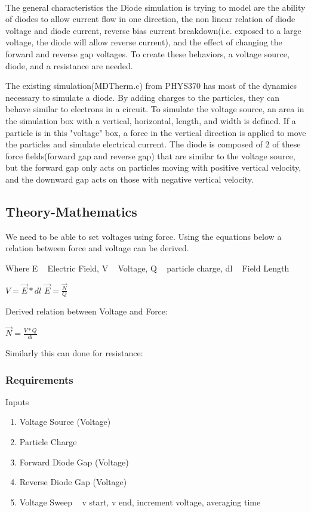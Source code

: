 \documentclass[a4paper]{article}
\begin{document}
\paragraph{}

The general characteristics the Diode simulation is trying to model are the ability of diodes to allow current flow in one direction, the non linear relation of diode voltage and diode current, reverse bias current breakdown(i.e. exposed to a large voltage, the diode will allow reverse current), and the effect of changing the forward and reverse gap voltages. To create these behaviors, a voltage source, diode, and a resistance are needed. 

The existing simulation(MDTherm.c) from PHYS370 has most of the dynamics necessary to simulate a diode. By adding charges to the particles, they can behave similar to electrons in a circuit. To simulate the voltage source, an area in the simulation box with a vertical, horizontal, length, and width is defined. If a particle is in this "voltage" box, a force in the vertical direction is applied to move the particles and simulate electrical current. The diode is composed of 2 of these force fields(forward gap and reverse gap) that are similar to the voltage source, but the forward gap only acts on particles moving with positive vertical velocity, and the downward gap acts on those with negative vertical velocity.

\subsection{Theory-Mathematics}

We need to be able to set voltages using force. Using the equations below a relation between force and voltage can be derived.

Where E ~ Electric Field, V ~ Voltage, Q ~ particle charge, dl ~ Field Length

$ V = \vec{E}*dl $ 
$ \vec{E} = \frac{\vec{N}}{Q} $

Derived relation between Voltage and Force:

$ \vec{N} = \frac{V*Q}{dl}$

Similarly this can done for resistance:

\subsubsection{Requirements}

Inputs
\begin{enumerate}
\item Voltage Source (Voltage)
\item Particle Charge
\item Forward Diode Gap (Voltage)
\item Reverse Diode Gap (Voltage)
\item Voltage Sweep ~ v start, v end, increment voltage, averaging time
\end{enumerate}
\end{document}
